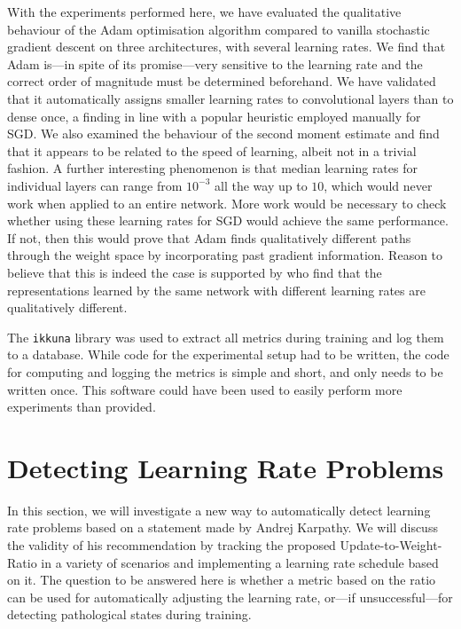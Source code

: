 With the experiments performed here, we have evaluated the qualitative behaviour
of the Adam optimisation algorithm compared to vanilla stochastic gradient
descent on three architectures, with several learning rates. We find that Adam
is---in spite of its promise---very sensitive to the learning rate and the
correct order of magnitude must be determined beforehand. We have validated that
it automatically assigns smaller learning rates to convolutional layers than to
dense once, a finding in line with a popular heuristic employed manually for
SGD. We also examined the behaviour of the second moment estimate and find that
it appears to be related to the speed of learning, albeit not in a trivial
fashion. A further interesting phenomenon is that median learning rates for
individual layers can range from $10^{-3}$ all the way up to $10$, which would
never work when applied to an entire network. More work would be necessary to
check whether using these learning rates for SGD would achieve the same
performance. If not, then this would prove that Adam finds qualitatively
different paths through the weight space by incorporating past gradient
information. Reason to believe that this is indeed the case is supported by
\citet{NIPS2018_7815} who find that the representations learned by the same
network with different learning rates are qualitatively different.

The \texttt{ikkuna} library was used to extract all metrics during training and
log them to a database. While code for the experimental setup had to be written,
the code for computing and logging the metrics is simple and short, and only
needs to be written once. This software could have been used to easily perform
more experiments than \citet{kingma2014adam} provided.

\section{Detecting Learning Rate Problems}%
\label{sec:detecting_learning_rate_problems}

In this section, we will investigate a new way to automatically detect learning
rate problems based on a statement made by Andrej Karpathy. We will discuss
the validity of his recommendation by tracking the proposed
Update-to-Weight-Ratio in a variety of scenarios and implementing a learning
rate schedule based on it. The question to be answered here is whether a metric
based on the ratio can be used for automatically adjusting the learning rate,
or---if unsuccessful---for detecting pathological states during training.

